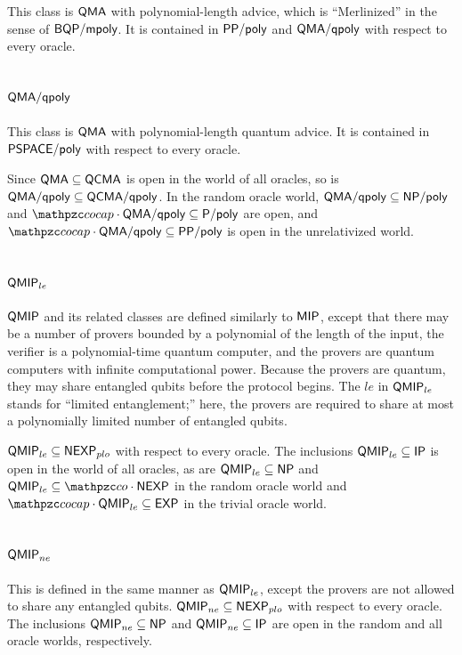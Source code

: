 This class is $\mathsf{QMA}$ with polynomial-length advice, which is ``Merlinized''
in the sense of $\mathsf{BQP}/\mathsf{mpoly}$. It is contained in $\mathsf{PP}/\mathsf{poly}$ and
$\mathsf{QMA}/\mathsf{qpoly}$ with respect to every oracle.

\subsection{$\mathsf{QMA}/\mathsf{qpoly}$}

This class is $\mathsf{QMA}$ with polynomial-length quantum advice. It is contained
in $\mathsf{PSPACE}/\mathsf{poly}$ with respect to every oracle.

Since $\mathsf{QMA}\subseteq\mathsf{QCMA}$ is open in the world of all oracles, so is 
$\mathsf{QMA}/\mathsf{qpoly}\subseteq\mathsf{QCMA}/\mathsf{qpoly}$. In the random oracle 
world, $\mathsf{QMA}/\mathsf{qpoly}\subseteq\mathsf{NP}/\mathsf{poly}$ and 
$\cocap\cdot\msf{QMA}/\msf{qpoly}\subseteq\sP/\poly$ are open, and 
$\cocap\cdot\msf{QMA}/\msf{qpoly}\subseteq\msf{PP}/\poly$ is open in the 
unrelativized world.

\subsection{$\mathsf{QMIP}_{le}$}

$\mathsf{QMIP}$ and its related classes are defined similarly to $\mathsf{MIP}$, 
except that there may be a number of provers bounded by a polynomial of the 
length of the input, the verifier is a polynomial-time quantum computer, and the
provers are quantum computers with infinite computational power. Because the 
provers are quantum, they may share entangled qubits before the protocol begins.
The $le$ in $\mathsf{QMIP}_{le}$ stands for ``limited entanglement;'' here, the 
provers are required to share at most a polynomially limited number of entangled
qubits.

$\mathsf{QMIP}_{le}\subseteq\mathsf{NEXP}_{plo}$ with respect to every oracle. The 
inclusions $\mathsf{QMIP}_{le}\subseteq\mathsf{IP}$ is open in the world of all 
oracles, as are $\mathsf{QMIP}_{le}\subseteq\mathsf{NP}$ and 
$\msf{QMIP}_{le}\subseteq\cco\cdot\msf{NEXP}$ in the random oracle world and 
$\cocap\cdot\msf{QMIP}_{le}\subseteq\msf{EXP}$ in the trivial oracle world.

\subsection{$\mathsf{QMIP}_{ne}$}

This is defined in the same manner as $\mathsf{QMIP}_{le}$, except the provers are 
not allowed to share any entangled qubits. 
$\mathsf{QMIP}_{ne}\subseteq\mathsf{NEXP}_{plo}$ with respect to every oracle. The 
inclusions $\mathsf{QMIP}_{ne}\subseteq\mathsf{NP}$ and $\mathsf{QMIP}_{ne}\subseteq\mathsf{IP}$ 
are open in the random and all oracle worlds, respectively.

